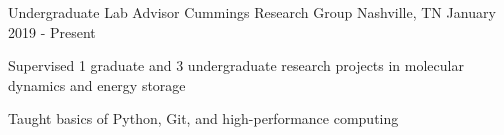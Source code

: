 
\begin{cventries}
  \cventry
    {Undergraduate Lab Advisor} %
    {Cummings Research Group} %
    {Nashville, TN} %
    {January 2019 - Present} %
    {
      \begin{cvitems} %
        \item {Supervised 1 graduate and 3 undergraduate research 
            projects in molecular dynamics and energy storage}
        \item {Taught basics of Python, Git, 
            and high-performance computing}
      \end{cvitems}
    }
\end{cventries}
